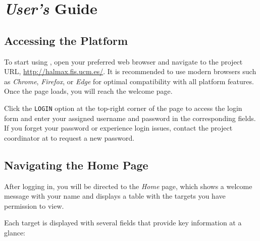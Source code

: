 
\part{\textsl{User's} Guide} \label{part:user}

    
\chapter{Accessing the Platform} \label{chap:user-access}

To start using \project, open your preferred web browser and navigate to the project URL, \url{http://halmax.fis.ucm.es/}. It is recommended to use modern browsers such as \textsl{Chrome}, \textsl{Firefox}, or \textsl{Edge} for optimal compatibility with all platform features. Once the page loads, you will reach the welcome page. 


Click the \texttt{LOGIN} option at the top-right corner of the page to access the login form and enter your assigned username and password in the corresponding fields. If you forget your password or experience login issues, contact the project coordinator at \href{mailto:\prjMail}{\prjMail} to request a new password.



\chapter{Navigating the Home Page} \label{chap:user-homepage}

After logging in, you will be directed to the \textsl{Home} page, which shows a welcome message with your name and displays a table with the targets you have permission to view.



Each target is displayed with several fields that provide key information at a glance:

